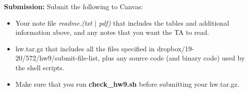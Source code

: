 \documentclass[11pt]{article}
\begin{document}
\vspace{0.5 in}
\noindent
{\bf Submission:}  Submit the following to Canvas:

\begin{itemize}
    \item Your note file {\it readme.(txt $\mid$ pdf)}
    that includes the tables and additional information above, and any notes that you want the TA to read.

  \item  hw.tar.gz that includes all the files specified in
      dropbox/19-20/572/hw9/submit-file-list, plus any source code
      (and binary code) used by the shell scripts.

  \item Make sure that you run {\bf check\_hw9.sh} before
    submitting your hw.tar.gz.
\end{itemize}
\end{document}
